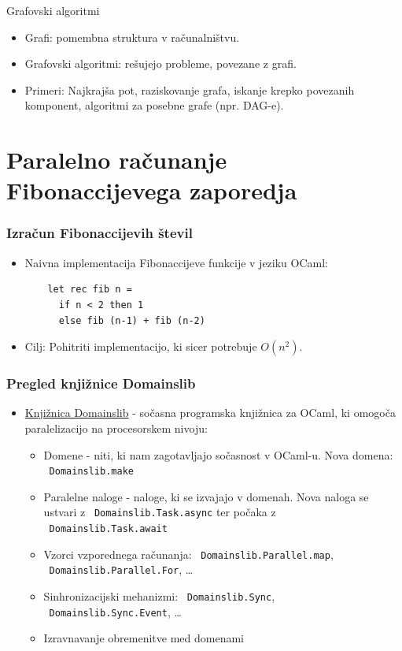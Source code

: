 \documentclass{beamer}
\begin{document}
\begin{frame}{Grafovski algoritmi}
    \begin{itemize}
        \item Grafi: pomembna struktura v računalništvu.
        \item Grafovski algoritmi: rešujejo probleme, povezane z grafi.
        \item Primeri: Najkrajša pot, raziskovanje grafa, iskanje krepko povezanih komponent, algoritmi za posebne grafe (npr. DAG-e).
    \end{itemize}
\end{frame}


\section{Paralelno računanje Fibonaccijevega zaporedja}

\begin{frame}[fragile]
    \frametitle{Izračun Fibonaccijevih števil}
    \begin{itemize}
        \item Naivna implementacija Fibonaccijeve funkcije v jeziku OCaml:
    \begin{verbatim}
    let rec fib n =
      if n < 2 then 1
      else fib (n-1) + fib (n-2)
    \end{verbatim}
        \item Cilj: Pohitriti implementacijo, ki sicer potrebuje $O(n^2)$.
    \end{itemize}
\end{frame}
    

\begin{frame}
    \frametitle{Pregled knjižnice Domainslib}
    \begin{itemize}
        \item \href{https://github.com/ocaml-multicore/domainslib}{Knjižnica Domainslib} - sočasna programska knjižnica za OCaml, ki omogoča paralelizacijo na procesorskem nivoju:
        \begin{itemize}
            \item Domene - niti, ki nam zagotavljajo sočasnost v OCaml-u. Nova domena: ~\texttt{Domainslib.make}
            \item Paralelne naloge - naloge, ki se izvajajo v domenah. Nova naloga se ustvari z ~\texttt{Domainslib.Task.async} ter počaka z ~\texttt{Domainslib.Task.await}
            \item Vzorci vzporednega računanja: ~\texttt{Domainslib.Parallel.map}, ~\texttt{Domainslib.Parallel.For}, \dots
            \item Sinhronizacijski mehanizmi: ~\texttt{Domainslib.Sync}, ~\texttt{Domainslib.Sync.Event}, \dots
            \item Izravnavanje obremenitve med domenami
        \end{itemize}
    \end{itemize}
\end{frame}
\end{document}
